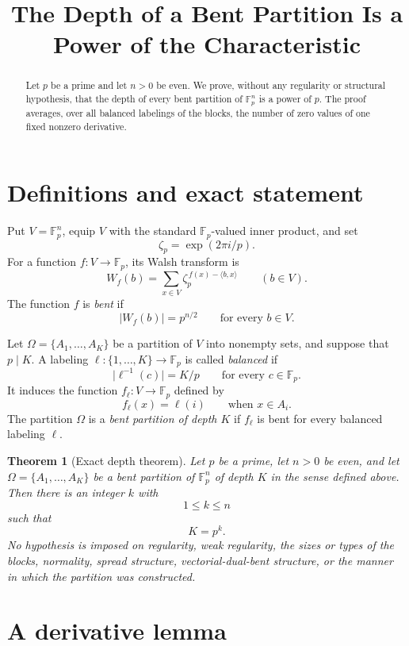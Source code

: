 \documentclass[11pt]{article}
\title{The Depth of a Bent Partition Is a Power of the Characteristic}
\author{}
\date{}
\newtheorem{theorem}{Theorem}
\theoremstyle{remark}
\newcommand{\F}{\mathbb F}
\newcommand{\zetaP}{\zeta_p}
\newcommand{\card}[1]{\lvert #1\rvert}
\newcommand{\ip}[2]{\langle #1,#2\rangle}
\begin{document}
\maketitle

\begin{abstract}
Let $p$ be a prime and let $n>0$ be even.  We prove, without any
regularity or structural hypothesis, that the depth of every bent
partition of $\F_p^n$ is a power of $p$.  The proof averages, over all
balanced labelings of the blocks, the number of zero values of one fixed
nonzero derivative.
\end{abstract}

\section{Definitions and exact statement}

Put $V=\F_p^n$, equip $V$ with the standard $\F_p$-valued inner
product, and set
\[
  \zetaP=\exp(2\pi i/p).
\]
For a function $f:V\to\F_p$, its Walsh transform is
\[
  W_f(b)=\sum_{x\in V}\zetaP^{\,f(x)-\ip{b}{x}}
  \qquad (b\in V).
\]
The function $f$ is \emph{bent} if
\[
  \card{W_f(b)}=p^{n/2}
  \qquad\text{for every }b\in V.
\]

Let $\Omega=\{A_1,\ldots,A_K\}$ be a partition of $V$ into nonempty
sets, and suppose that $p\mid K$.  A labeling
\(\ell:\{1,\ldots,K\}\to\F_p\) is called \emph{balanced} if
\[
  \card{\ell^{-1}(c)}=K/p
  \qquad\text{for every }c\in\F_p.
\]
It induces the function $f_\ell:V\to\F_p$ defined by
\[
  f_\ell(x)=\ell(i)\qquad\text{when }x\in A_i.
\]
The partition $\Omega$ is a \emph{bent partition of depth $K$} if
$f_\ell$ is bent for every balanced labeling $\ell$.

\begin{theorem}[Exact depth theorem]\label{thm:main}
Let $p$ be a prime, let $n>0$ be even, and let
$\Omega=\{A_1,\ldots,A_K\}$ be a bent partition of $\F_p^n$ of depth
$K$ in the sense defined above.  Then there is an integer $k$ with
\[
  1\leq k\leq n
\]
such that
\[
  K=p^k.
\]
No hypothesis is imposed on regularity, weak regularity, the sizes or
types of the blocks, normality, spread structure, vectorial-dual-bent
structure, or the manner in which the partition was constructed.
\end{theorem}

\section{A derivative lemma}
\end{document}
